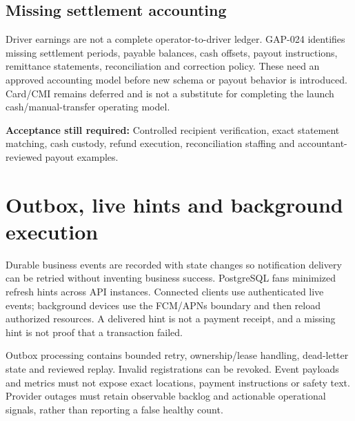 \documentclass[11pt,a4paper]{article}
\newcommand{\gate}[1]{\par\textbf{Acceptance still required:} #1\par}
\begin{document}
\subsection{Missing settlement accounting}
Driver earnings are not a complete operator-to-driver ledger. GAP-024 identifies
missing settlement periods, payable balances, cash offsets, payout instructions,
remittance statements, reconciliation and correction policy. These need an
approved accounting model before new schema or payout behavior is introduced.
Card/CMI remains deferred and is not a substitute for completing the launch
cash/manual-transfer operating model.
\gate{Controlled recipient verification, exact statement matching, cash custody,
refund execution, reconciliation staffing and accountant-reviewed payout examples.}

\section{Outbox, live hints and background execution}
Durable business events are recorded with state changes so notification delivery
can be retried without inventing business success. PostgreSQL fans minimized
refresh hints across API instances. Connected clients use authenticated live
events; background devices use the FCM/APNs boundary and then reload authorized
resources. A delivered hint is not a payment receipt, and a missing hint is not
proof that a transaction failed.

Outbox processing contains bounded retry, ownership/lease handling, dead-letter
state and reviewed replay. Invalid registrations can be revoked. Event payloads
and metrics must not expose exact locations, payment instructions or safety text.
Provider outages must retain observable backlog and actionable operational
signals, rather than reporting a false healthy count.
\end{document}

